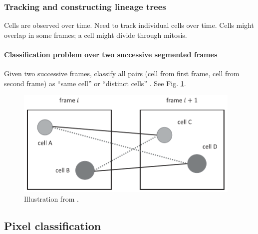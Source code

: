 \documentclass[11pt]{article} %
\begin{document}
    \subsubsection{Tracking and constructing lineage trees}
Cells are observed over time. Need to track individual cells over time. Cells might overlap in some frames; a cell might divide through mitosis.
    \paragraph{Classification problem over two successive segmented frames}
Given two successive frames, classify all pairs (cell from first frame, cell from second frame) as ``same cell'' or ``distinct cells'' \cite{kan:machine}. See Fig. \ref{fig:tracking}.

\begin{figure}[h!]
  \centering
  \includegraphics[width=.75 \linewidth ]{tracking.png}
  \caption{Illustration from \cite{kan:machine}.}
  \label{fig:tracking}
\end{figure}

  \subsection{Pixel classification}
\end{document}
